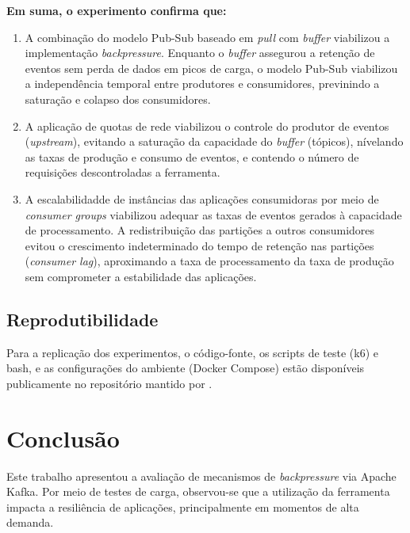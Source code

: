 \documentclass[12pt]{article}
\begin{document}
  \textbf{Em suma, o experimento confirma que:}

  \begin{enumerate}
    \item A combinação do modelo Pub-Sub baseado em \textit{pull} com \textit{buffer} viabilizou a implementação \textit{backpressure}. Enquanto o \textit{buffer} assegurou a retenção de eventos sem perda de dados em picos de carga, o modelo Pub-Sub viabilizou a independência temporal entre produtores e consumidores, previnindo a saturação e colapso dos consumidores.

    \item A aplicação de quotas de rede viabilizou o controle do produtor de eventos (\textit{upstream}), evitando a saturação da capacidade do \textit{buffer} (tópicos), nívelando as taxas de produção e consumo de eventos, e contendo o número de requisições descontroladas a ferramenta.

    \item A escalabilidadde de instâncias das aplicações consumidoras por meio de \textit{consumer groups} viabilizou adequar as taxas de eventos gerados à capacidade de processamento. A redistribuição das partições a outros consumidores evitou o crescimento indeterminado do tempo de retenção nas partições (\textit{consumer lag}), aproximando a taxa de processamento da taxa de produção sem comprometer a estabilidade das aplicações.
  \end{enumerate}

  \subsection{Reprodutibilidade}
  Para a replicação dos experimentos, o código-fonte, os scripts de teste (k6) e bash, e as configurações do ambiente (Docker Compose) estão disponíveis publicamente no repositório mantido por \cite{garbo2026kafka}.

  \section{Conclusão}
  Este trabalho apresentou a avaliação de mecanismos de \textit{backpressure} via Apache Kafka. Por meio de testes de carga, observou-se que a utilização da ferramenta impacta a resiliência de aplicações, principalmente em momentos de alta demanda.
\end{document}
